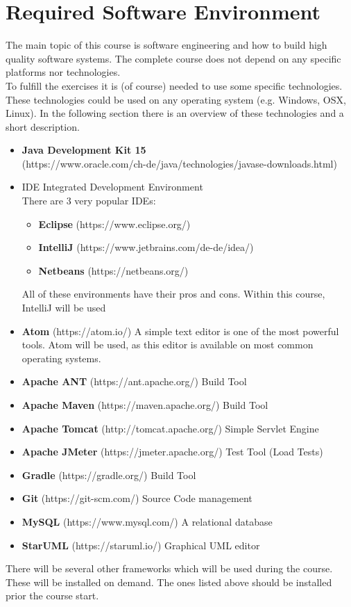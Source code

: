 
\section{Required Software Environment}
The main topic of this course is software engineering and how
to build high quality software systems. The complete course does
not depend on any specific platforms nor technologies.\\
To fulfill the exercises it is (of course) needed to use
some specific technologies. These technologies could be used
on any operating system (e.g. Windows, OSX, Linux). In the
following section there is an overview of these technologies and
a short description.\\

\begin{itemize}
\item \textbf{Java Development Kit 15}\\
(https://www.oracle.com/ch-de/java/technologies/javase-downloads.html)
\item IDE Integrated Development Environment\\
There are 3 very popular IDEs:
\begin{itemize}
\item \textbf{Eclipse} (https://www.eclipse.org/)
\item \textbf{IntelliJ} (https://www.jetbrains.com/de-de/idea/)
\item \textbf{Netbeans} (https://netbeans.org/)
\end{itemize}
All of these environments have their pros and cons. Within this course, IntelliJ
will be used
\item \textbf{Atom} (https://atom.io/)
A simple text editor is one of the most powerful tools. Atom will be used, as
this editor is available on most common operating systems.
\item \textbf{Apache ANT} (https://ant.apache.org/)
Build Tool
\item \textbf{Apache Maven} (https://maven.apache.org/)
Build Tool
\item \textbf{Apache Tomcat} (http://tomcat.apache.org/)
Simple Servlet Engine
\item \textbf{Apache JMeter} (https://jmeter.apache.org/)
Test Tool (Load Tests)
\item \textbf{Gradle} (https://gradle.org/)
Build Tool
\item \textbf{Git} (https://git-scm.com/)
Source Code management
\item \textbf{MySQL} (https://www.mysql.com/)
A relational database
\item \textbf{StarUML} (https://staruml.io/)
Graphical UML editor
\end{itemize}

\vspace{1mm}

There will be several other frameworks which will be used during the course.
These will be installed on demand. The ones listed above should be installed
prior the course start.
